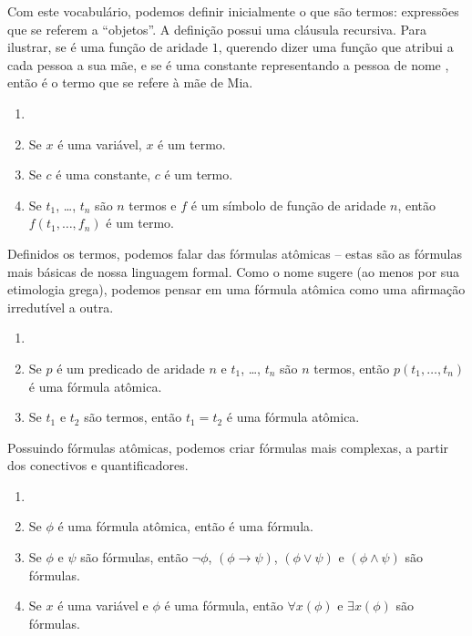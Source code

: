 Com este vocabulário, podemos definir inicialmente o que são termos: expressões que se referem a ``objetos''. A definição possui uma cláusula recursiva. Para ilustrar, se  é uma função de aridade $1$, querendo dizer uma função que atribui a cada pessoa a sua mãe, e se  é uma constante representando a pessoa de nome , então  é o termo que se refere à mãe de Mia.

\begin{defn}[Termo]
\begin{enumerate}
\item[]
\item Se $x$ é uma variável, $x$ é um termo.
\item Se $c$ é uma constante, $c$ é um termo.
\item Se $t_1$, \dots, $t_n$ são $n$ termos e $f$ é um símbolo de função de aridade $n$, então $f(t_1,\dots,f_n)$ é um termo.
\end{enumerate}
\end{defn}

Definidos os termos, podemos falar das fórmulas atômicas -- estas são as fórmulas mais básicas de nossa linguagem formal. Como o nome sugere (ao menos por sua etimologia grega), podemos pensar em uma fórmula atômica como uma afirmação irredutível a outra.

\begin{defn}
\begin{enumerate}
\item []
\item Se $p$ é um predicado de aridade $n$ e $t_1$, \dots, $t_n$ são $n$ termos, então $p(t_1,\dots,t_n)$ é uma fórmula atômica.
\item Se $t_1$ e $t_2$ são termos, então $t_1 = t_2$ é uma fórmula atômica.
\end{enumerate}
\end{defn}

Possuindo fórmulas atômicas, podemos criar fórmulas mais complexas, a partir dos conectivos e quantificadores.

\begin{defn}[Fórmula]
\begin{enumerate}
\item[]
\item Se $\phi$ é uma fórmula atômica, então é uma fórmula.
\item Se $\phi$ e $\psi$ são fórmulas, então $\neg \phi$, $(\phi \rightarrow \psi)$, $(\phi \lor \psi)$ e $(\phi \land \psi)$ são fórmulas.
\item Se $x$ é uma variável e $\phi$ é uma fórmula, então $\forall x(\phi)$ e $\exists x(\phi)$ são fórmulas.
\end{enumerate}
\end{defn}

